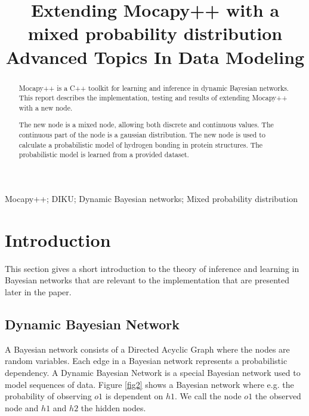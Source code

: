\documentclass[10pt, journal, compsoc, a4paper]{IEEEtran}
\begin{document}
\title{Extending Mocapy++ with a mixed probability distribution\\Advanced Topics In Data Modeling}

\author{
}

\maketitle

\begin{abstract}
Mocapy++ is a C++ toolkit for learning and inference in dynamic Bayesian networks. This report describes the implementation, testing and results of extending Mocapy++ with a new node. 

The new node is a mixed node, allowing both discrete and continuous values. The continuous part of the node is a gaussian distribution. The new node is used to calculate a probabilistic model of hydrogen bonding in protein structures. The probabilistic model is learned from a provided dataset.
\end{abstract}

\begin{IEEEkeywords}
Mocapy++; DIKU; Dynamic Bayesian networks; Mixed probability distribution
\end{IEEEkeywords}


\section{Introduction} %
\label{sec:introduction}

This section gives a short introduction to the theory of inference and learning in Bayesian networks that are relevant to the implementation that are presented later in the paper.

\subsection{Dynamic Bayesian Network} %
\label{sub:dynamic_bayesian_network}
A Bayesian network consists of a Directed Acyclic Graph where the nodes are random variables. Each edge in a Bayesian network represents a probabilistic dependency. A Dynamic Bayesian Network is a special Bayesian network used to model sequences of data. Figure \ref{fig2} shows a Bayesian network where e.g. the probability of observing $o1$ is dependent on $h1$. We call the node $o1$ the observed node and $h1$ and $h2$ the hidden nodes. 
\end{document}

